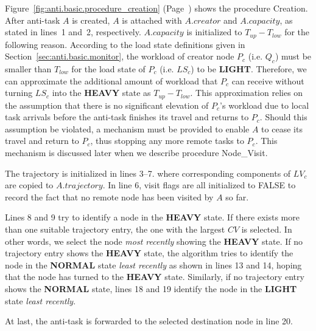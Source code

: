 Figure~\ref{fig:anti.basic.procedure_creation} 
(Page~\pageref{fig:anti.basic.procedure_creation})
shows the procedure {\sc Creation}.
After anti-task $A$ is created, $A$ is attached with
$A.creator$ and $A.capacity$,
as stated in lines~1 and~2, respectively.
%
$A.capacity$ is initialized to $T_{up} - T_{low}$ for the following reason.
According to the load state definitions given in 
Section~\ref{sec:anti.basic.monitor},
the workload of creator node $P_c$ (i.e. $Q_c$)
must be smaller than $T_{low}$ for the
load state of $P_c$ (i.e. $LS_c$) to be {\bf LIGHT}.
Therefore, we can approximate the additional amount of workload that
$P_c$ can receive without turning $LS_c$ into the {\bf HEAVY} state as 
$T_{up} - T_{low}$.
%
This approximation relies on the assumption that there is no
significant elevation of $P_c$'s workload due to local task arrivals
before the anti-task finishes its travel and returns to $P_c$.
Should this assumption be violated,
a mechanism must be provided to enable $A$ to cease its travel
and return to $P_c$, thus stopping any more remote tasks to $P_c$.
This mechanism is discussed later when we describe
procedure {\sc Node\_Visit}.

The trajectory is initialized in lines 3--7.
where corresponding components of $LV_c$ are copied to $A.trajectory$.
In line 6, visit flags are all initialized to FALSE
to record the fact that no remote node has been visited by $A$ so far.

Lines 8 and 9 try to identify a node in the {\bf HEAVY} state.
If there exists more than one suitable trajectory entry,
the one with the largest $CV$ is selected.
In other words, we select the node {\it most recently\/}
showing the {\bf HEAVY} state.
%
If no trajectory entry shows the {\bf HEAVY} state,
the algorithm tries to identify the node in
the {\bf NORMAL} state {\it least recently\/} as shown in lines 13 and 14,
hoping that the node has turned to the {\bf HEAVY} state.
Similarly, if no trajectory entry shows the {\bf NORMAL} state,
lines 18 and 19 identify the node in the {\bf LIGHT} state
{\it least recently\/}.

At last,
the anti-task is forwarded to the selected destination node in line 20.


